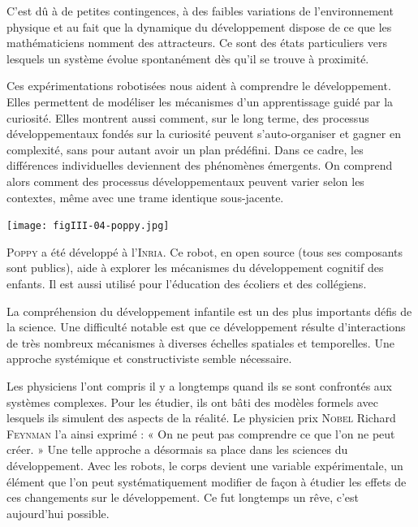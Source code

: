 C’est dû à de petites contingences, à des faibles variations de l’environnement physique et au fait que la dynamique du développement dispose de ce que les mathématiciens nomment des attracteurs. Ce sont des états particuliers vers lesquels un système évolue spontanément dès qu’il se trouve à proximité.

Ces expérimentations robotisées nous aident à comprendre le développement. Elles permettent de modéliser les mécanismes d’un apprentissage guidé par la curiosité. Elles montrent aussi comment, sur le long terme, des processus développementaux fondés sur la curiosité peuvent s’auto-organiser et gagner en complexité, sans pour autant avoir un plan prédéfini. Dans ce cadre, les différences individuelles deviennent des phénomènes émergents. On comprend alors comment des processus développementaux peuvent varier selon les contextes, même avec une trame identique sous-jacente.

\begin{jazzfigure*}
\texttt{[image: figIII-04-poppy.jpg]}
\vspace{-10pt}
\caption{\label{fig:III.4}\textsc{Poppy} a été développé à l’\textsc{Inria}. Ce robot, en \textup{open source} (tous ses composants sont publics), aide à explorer les mécanismes du développement cognitif des enfants. Il est aussi utilisé pour l’éducation des écoliers et des collégiens.}
\end{jazzfigure*}


La compréhension du développement infantile est un des plus importants défis de la science. Une difficulté notable est que ce développement résulte d’interactions de très nombreux mécanismes à diverses échelles spatiales et temporelles. Une approche systémique et constructiviste semble nécessaire.

Les physiciens l’ont compris il y a longtemps quand ils se sont con\-frontés aux systèmes complexes. Pour les étudier, ils ont bâti des modèles formels avec lesquels ils simulent des aspects de la réalité. Le physicien prix \textsc{Nobel} Richard \textsc{Feynman} l’a ainsi exprimé : « On ne peut pas comprendre ce que l’on ne peut créer. » Une telle approche a désormais sa place dans les sciences du développement. Avec les robots, le corps devient une variable expérimentale, un élément que l’on peut systématiquement modifier de façon à étudier les effets de ces changements sur le développement. Ce fut longtemps un rêve, c’est aujourd’hui possible.


